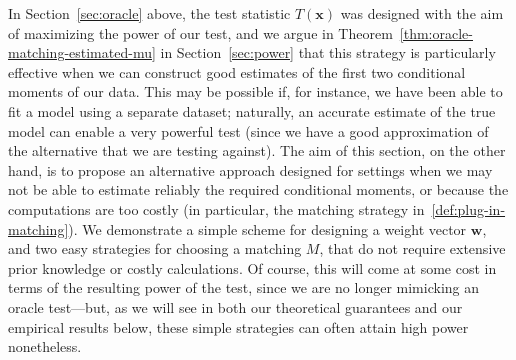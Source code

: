 \documentclass[12pt]{article}
\newcommand{\bx}{\mathbf{x}}
\newcommand{\bw}{\mathbf{w}}
\begin{document}
In Section~\ref{sec:oracle} above, the test statistic $T(\bx)$ was designed with the aim of maximizing the power of our test, and we argue in Theorem~\ref{thm:oracle-matching-estimated-mu} in Section~\ref{sec:power} that this strategy is particularly effective when we can construct good estimates of the first two conditional moments of our data.  This may be possible if, for instance, we have been able to fit a model using a separate dataset; naturally, an accurate estimate of the true model can enable a very powerful test (since we have a good approximation of the alternative that we are testing against).  The aim of this section, on the other hand, is to propose an alternative approach designed for settings when we may not be able to estimate reliably the required conditional moments, or because the computations are too costly (in particular, the matching strategy in~\eqref{def:plug-in-matching}).  We demonstrate a simple scheme for designing a weight vector $\bw$, and two easy strategies for choosing a matching $M$, that do not require extensive prior knowledge or costly calculations.  Of course, this will come at some cost in terms of the resulting power of the test, since we are no longer mimicking an oracle test---but, as we will see in both our theoretical guarantees and our empirical results below, these simple strategies can often attain high power nonetheless.
\end{document}
